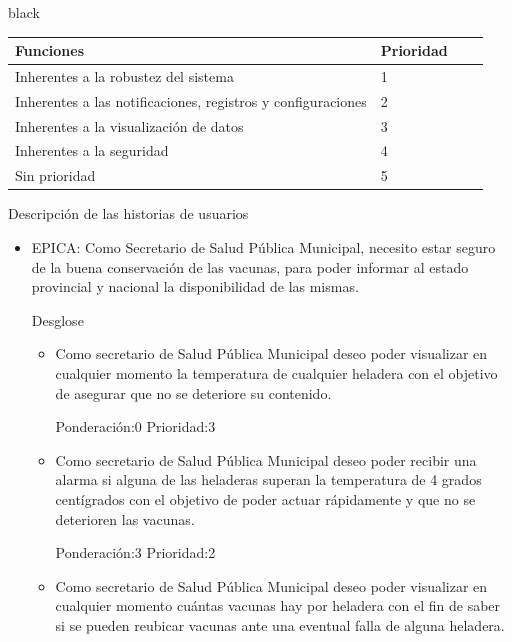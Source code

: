 \documentclass[11pt]{charter}
\begin{document}
\begin{consigna}{black}
\begin{table}[ht]
\begin{tabularx}{\linewidth}{@{}|l|X|X|l|@{}}
\hline
\rowcolor[HTML]{C0C0C0}
Funciones           & Prioridad 	\\ \hline
Inherentes a la robustez del sistema & 1 \\ \hline
Inherentes a las notificaciones, registros y configuraciones& 2 \\ \hline
Inherentes a la visualización de datos &3 \\ \hline
Inherentes a la seguridad & 4 \\ \hline
Sin prioridad & 5 \\ \hline
\end{tabularx}
\end{table}

Descripción de las historias de usuarios


\begin{itemize}
\item EPICA: Como Secretario de Salud Pública Municipal, necesito estar seguro de la buena conservación de las vacunas, para poder informar al estado provincial y nacional la disponibilidad de las mismas.

Desglose
	\begin{itemize}
	\item 
    Como secretario de Salud Pública Municipal deseo poder visualizar en cualquier momento la temperatura de cualquier heladera con el objetivo de asegurar que no se deteriore su contenido. 
    
Ponderación:0 Prioridad:3
	\end{itemize}
	
	\begin{itemize}
	\item 
	Como secretario de Salud Pública Municipal deseo poder recibir una alarma si alguna de las heladeras superan la temperatura de 4 grados centígrados con el objetivo de poder actuar rápidamente y que no se deterioren las vacunas. 
	
Ponderación:3 Prioridad:2
	\end{itemize}

	\begin{itemize}
	\item 
	Como secretario de Salud Pública Municipal deseo poder visualizar en cualquier momento cuántas vacunas hay por heladera con el fin de saber si se pueden reubicar vacunas ante una eventual falla de alguna heladera. 


\end{itemize}
\end{itemize}
\end{consigna}
\end{document}
